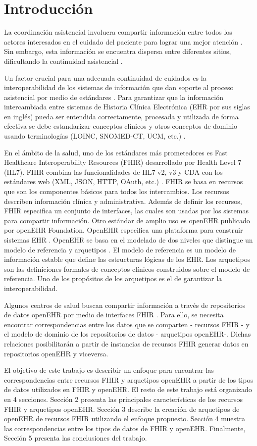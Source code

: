 \section{Introducción}

La coordinación asistencial involucra compartir información entre todos los actores interesados en el cuidado del paciente para lograr una mejor atención \cite{CareCoordination}. Sin embargo, esta información se encuentra dispersa entre diferentes sitios, dificultando la continuidad asistencial \cite{Indarte11}.

Un factor crucial para una adecuada continuidad de cuidados es la interoperabilidad de los sistemas de información que dan soporte al proceso asistencial por medio de estándares \cite{OPS16}. Para garantizar que la información intercambiada entre sistemas de Historia Clínica Electrónica (EHR por sus siglas en inglés) pueda ser entendida correctamente, procesada y utilizada de forma efectiva se debe estandarizar conceptos clínicos y otros conceptos de dominio usando terminologías (LOINC, SNOMED-CT, UCM, etc.) \cite{ISO20514}.

En el ámbito de la salud, uno de los estándares más prometedores es Fast Healthcare Interoperability Resources (FHIR) desarrollado por Health Level 7 (HL7). FHIR combina las funcionalidades de HL7 v2, v3 y CDA con los estándares web (XML, JSON, HTTP, OAuth, etc.) \cite{FHIR}. FHIR se basa en recursos que son los componentes básicos para todos los intercambios. Los recursos describen información clínica y administrativa. Además de definir los recursos, FHIR especifica un conjunto de interfaces, las cuales son usadas por los sistemas para compartir información. Otro estándar de amplio uso es openEHR publicado por openEHR Foundation. OpenEHR especifica una plataforma para construir sistemas EHR \cite{openEHR}. OpenEHR se basa en el modelado de dos niveles que distingue un modelo de referencia y arquetipos \cite{Bale00}. El modelo de referencia es un modelo de información estable que define las estructuras lógicas de los EHR. Los arquetipos son las definiciones formales de conceptos clínicos construidos sobre el modelo de referencia. Uno de los propósitos de los arquetipos es el de garantizar la interoperabilidad.

Algunos centros de salud buscan compartir información a través de repositorios de datos openEHR por medio de interfaces FHIR \cite{Lopez16}. Para ello, se necesita encontrar correspondencias entre los datos que se comparten - recursos FHIR - y el modelo de dominio de los repositorios de datos - arquetipos openEHR-. Dichas relaciones posibilitarán a partir de instancias de recursos FHIR generar datos en repositorios openEHR y viceversa.

El objetivo de este trabajo es describir un enfoque para encontrar las correspondencias entre recursos FHIR y arquetipos openEHR a partir de los tipos de datos utilizados en FHIR y openEHR. El resto de este trabajo está organizado en 4 secciones. Sección 2 presenta las principales características de los recursos FHIR y arquetipos openEHR. Sección 3 describe la creación de arquetipos de openEHR de recursos FHIR utilizando el enfoque propuesto. Sección 4 muestra las correspondencias entre los tipos de datos de FHIR y openEHR. Finalmente, Sección 5 presenta las conclusiones del trabajo.
